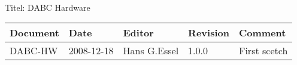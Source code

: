 \\Titel: DABC Hardware
\begin{table}[h]
\begin{tabular}{|p{2.8cm}|p{2.0cm}|p{3.0cm}|p{1.6cm}|p{5.0cm}|} \hline
Document   & Date        & Editor       & Revision & Comment \\
\hline DABC-HW & 2008-12-18 & Hans G.Essel & 1.0.0      & First
scetch \\ \hline
\end{tabular}
\end{table}
